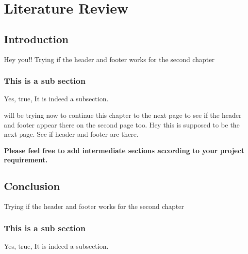 \chapter{Literature Review} \label{Literature Review}
\section{Introduction} \label{Introduction}
Hey you!! Trying if the header and footer works for the second chapter
\subsection{This is a sub section} \label{This is a sub section}
Yes, true, It is indeed a subsection.

will be trying now to continue this chapter to the next page to see if the header and footer appear there on the second page too.
\newpage
Hey this is supposed to be the next page. See if header and footer are there.

{\bfseries Please feel free to add intermediate sections according to your project requirement.}
\section{Conclusion} \label{Conclusion}
Trying if the header and footer works for the second chapter
\subsection{This is a sub section} \label{This is a sub section}
Yes, true, It is indeed a subsection.